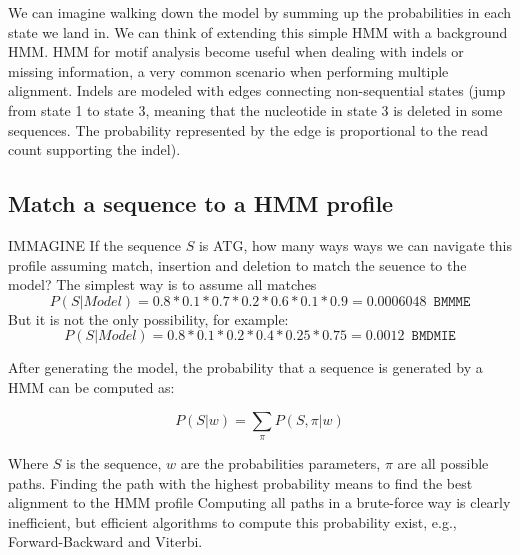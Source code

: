 		We can imagine walking down the model by summing up the probabilities in each state we land in. 
		We can think of extending this simple HMM with a background HMM.
		HMM for motif analysis become useful when dealing with indels or missing information, a very common scenario when performing multiple alignment.
		Indels are modeled with edges connecting non-sequential states (jump from state 1 to state 3, meaning that the nucleotide in state 3 is deleted in some sequences. The probability represented by the edge is proportional to the read count supporting the indel).
		
		\subsection{Match a sequence to a HMM profile}
		IMMAGINE
		If the sequence $S$ is ATG, how many ways ways we can navigate this profile assuming match, insertion and deletion to match the seuence to the model? 
		The simplest way is to assume all matches
		$$P(S|Model) = 0.8*0.1*0.7*0.2*0.6*0.1*0.9 = 0.0006048 \,\,\, \texttt{BMMME}$$
		But it is not the only possibility, for example:
		$$P(S|Model) = 0.8*0.1*0.2*0.4*0.25*0.75 = 0.0012 \,\,\, \texttt{BMDMIE}$$
		
				After generating the model, the probability that a sequence is generated by a HMM can be computed as:

		$$P(S|w) = \sum\limits_\pi P(S, \pi |w)$$

		Where $S$ is the sequence, $w$ are the probabilities parameters, $\pi$ are all possible paths. 
		Finding the path with the highest probability means to find the best alignment to the HMM profile
		Computing all paths in a brute-force way is clearly inefficient, but efficient algorithms to compute this probability exist, e.g., Forward-Backward and Viterbi.
	
